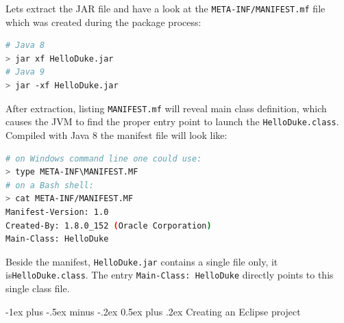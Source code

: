 \documentclass[10pt,landscape,a4paper]{article}
\makeatletter
\renewcommand{\section}{\@startsection{section}{1}{0mm}%
                                {-1ex plus -.5ex minus -.2ex}%
                                {0.5ex plus .2ex}%
                                {\normalfont\large\bfseries}}
\makeatother
\begin{document}
\begin{multicols}{2}
\begin{lstlisting}[language=bash,frame=single]
\end{lstlisting}
Lets extract the JAR file and have a look at the \texttt{META-INF/MANIFEST.mf} file which was created during the package process:
\begin{lstlisting}[language=bash,frame=single]
# Java 8
> jar xf HelloDuke.jar
# Java 9
> jar -xf HelloDuke.jar
\end{lstlisting}
After extraction, listing \texttt{MANIFEST.mf} will reveal main class definition, which causes the JVM to find the proper entry point to launch the \texttt{HelloDuke.class}. Compiled with Java 8 the manifest file will look like:
\begin{lstlisting}[language=bash,frame=single]
# on Windows command line one could use:
> type META-INF\MANIFEST.MF
# on a Bash shell:
> cat META-INF/MANIFEST.MF
Manifest-Version: 1.0
Created-By: 1.8.0_152 (Oracle Corporation)
Main-Class: HelloDuke
\end{lstlisting}
Beside the manifest, \texttt{HelloDuke.jar} contains a single file only, it is\texttt{HelloDuke.class}. The entry \texttt{Main-Class: HelloDuke} directly points to this single class file.

\section{Creating an Eclipse project}

\end{multicols}
\end{document}
